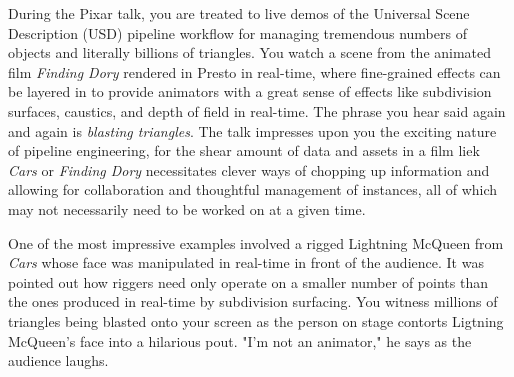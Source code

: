 \documentclass[../main.tex]{subfiles}
\begin{document}
During the Pixar talk, you are treated to live demos of the Universal Scene Description  (USD) pipeline workflow for managing tremendous numbers of objects and literally billions of triangles. You watch a scene from the animated film \textit{Finding Dory} rendered in Presto in real-time, where fine-grained effects can be layered in to provide animators with a great sense of effects like subdivision surfaces, caustics, and depth of field in real-time. The phrase you hear said again and again is \textit{blasting triangles}. The talk impresses upon you the exciting nature of pipeline engineering, for the shear amount of data and assets in a film liek \textit{Cars} or \textit{Finding Dory} necessitates clever ways of chopping up information and allowing for collaboration and thoughtful management of instances, all of which may not necessarily need to be worked on at a given time.

One of the most impressive examples involved a rigged Lightning McQueen from \textit{Cars} whose face was manipulated in real-time in front of the audience. It was pointed out how riggers need only operate on a smaller number of points than the ones produced in real-time by subdivision surfacing. You witness millions of triangles being blasted onto your screen as the person on stage contorts Ligtning McQueen's face into a hilarious pout. "I'm not an animator," he says as the audience laughs.
\end{document}
